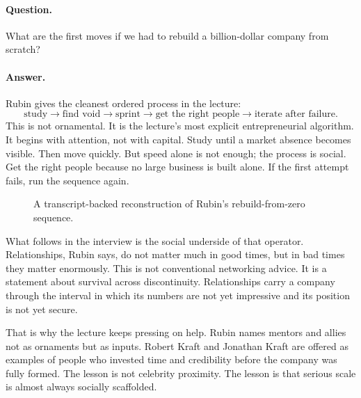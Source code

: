 \paragraph{Question.} What are the first moves if we had to rebuild a billion-dollar company from scratch?

\paragraph{Answer.} Rubin gives the cleanest ordered process in the lecture:
\begin{equation}
\text{study}\to\text{find void}\to\text{sprint}\to\text{get the right people}\to\text{iterate after failure}.
\end{equation}
This is not ornamental. It is the lecture's most explicit entrepreneurial algorithm. It begins with attention, not with capital. Study until a market absence becomes visible. Then move quickly. But speed alone is not enough; the process is social. Get the right people because no large business is built alone. If the first attempt fails, run the sequence again.

\begin{figure}
\centering
{}
\caption{A transcript-backed reconstruction of Rubin's rebuild-from-zero sequence.}
\end{figure}

What follows in the interview is the social underside of that operator. Relationships, Rubin says, do not matter much in good times, but in bad times they matter enormously. This is not conventional networking advice. It is a statement about survival across discontinuity. Relationships carry a company through the interval in which its numbers are not yet impressive and its position is not yet secure.

That is why the lecture keeps pressing on help. Rubin names mentors and allies not as ornaments but as inputs. Robert Kraft and Jonathan Kraft are offered as examples of people who invested time and credibility before the company was fully formed. The lesson is not celebrity proximity. The lesson is that serious scale is almost always socially scaffolded.

